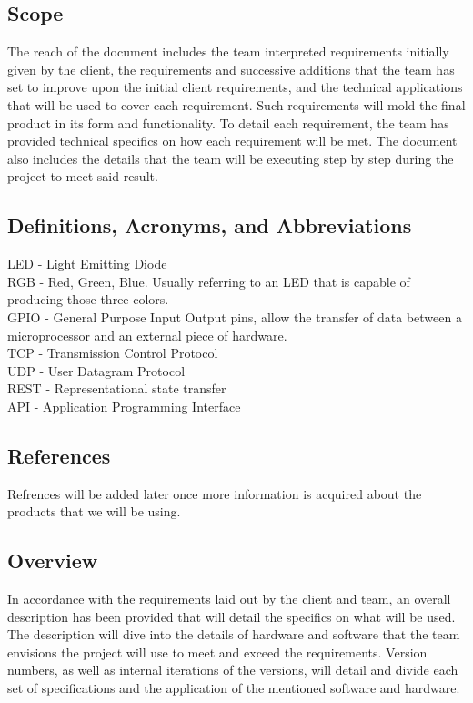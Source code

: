 \documentclass[onecolumn, draftclsnofoot,10pt, compsoc]{IEEEtran}
\begin{document}
		\subsection*{Scope}
			The reach of the document includes the team interpreted requirements initially given by the client, the requirements and successive additions that the team has set to improve upon the initial
			client requirements, and the technical applications that will be used to cover each requirement.  Such requirements will mold the final product in its form and functionality.
			To detail each requirement, the team has provided technical specifics on how each requirement will be met.  The document also includes the details that the team will be executing step by step
			during the project to meet said result.

		\subsection*{Definitions, Acronyms, and Abbreviations}
			LED - Light Emitting Diode \\
			RGB - Red, Green, Blue. Usually referring to an LED that is capable of producing those three colors. \\
			GPIO - General Purpose Input Output pins, allow the transfer of data between a microprocessor and an external piece of hardware. \\
			TCP - Transmission Control Protocol \\
			UDP - User Datagram Protocol \\
			REST - Representational state transfer \\
			API - Application Programming Interface \\

		\subsection*{References}
			Refrences will be added later once more information is acquired about the products that we will be using.


		\subsection*{Overview}
			In accordance with the requirements laid out by the client and team, an overall description has been provided that will detail the specifics on what will be used.  The description will dive into
			the details of hardware and software that the team envisions the project will use to meet and exceed the requirements.  Version numbers, as well as internal iterations of the versions, will detail
			and divide each set of specifications and the application of the mentioned software and hardware.
\end{document}
